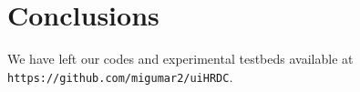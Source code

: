 \documentclass[review]{elsarticle}
\newcommand{\repair}{Re-Pair}
\newcommand{\repairNo}{\texttt{RePair}}
\newcommand{\rlcsa}{\texttt{RLCSA}}
\newcommand{\wcsa}{\texttt{WCSA}}
\newcommand{\slp}{\texttt{SLP}}
\newcommand{\wslp}{\texttt{WSLP}}
\newcommand{\lzindex}{\texttt{LZ77-index}}
\newcommand{\lzendindex}{\texttt{LZend-index}}
\begin{document}
%




\section{Conclusions}


We have left our codes and experimental testbeds available at
{\tt https://github.com/migumar2/uiHRDC}.




\end{document}
